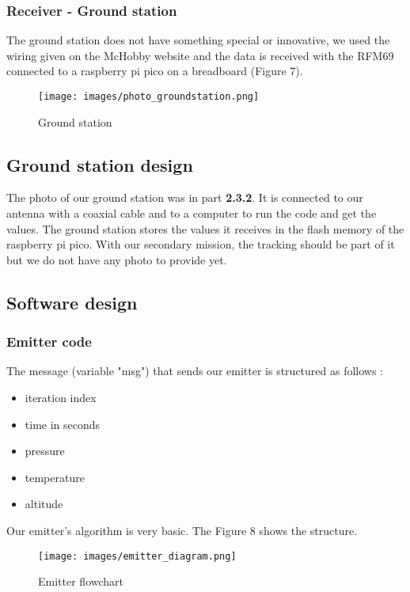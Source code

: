 \documentclass[]{article}
\begin{document}
\subsubsection{Receiver - Ground station}

The ground station does not have something special or innovative, we used the wiring given on the
McHobby website and the data is received with the RFM69 connected to a raspberry pi pico on a breadboard (Figure 7).

\begin{figure}[h] 
    \centering
    \texttt{[image: images/photo\_groundstation.png]} 
    \caption{Ground station}
\end{figure}

\subsection{Ground station design}

The photo of our ground station was in part \textbf{2.3.2}. It is connected to our antenna with a coaxial cable and to 
a computer to run the code and get the values. The ground station stores the values it receives in the flash memory of the 
raspberry pi pico. With our secondary mission, the tracking should be part of it but we
do not have any photo to provide yet. 

\subsection{Software design}
\subsubsection{Emitter code}

The message (variable "msg") that sends our emitter is structured as follows : 

\begin{itemize}[left=4em]
    \item iteration index
    \item time in seconds
    \item pressure
    \item temperature
    \item altitude
\end{itemize}

Our emitter's algorithm is very basic. The Figure 8 shows the structure. 

\begin{figure}[h] 
    \centering
    \texttt{[image: images/emitter\_diagram.png]} 
    \caption{Emitter flowchart}
\end{figure}
\end{document}
